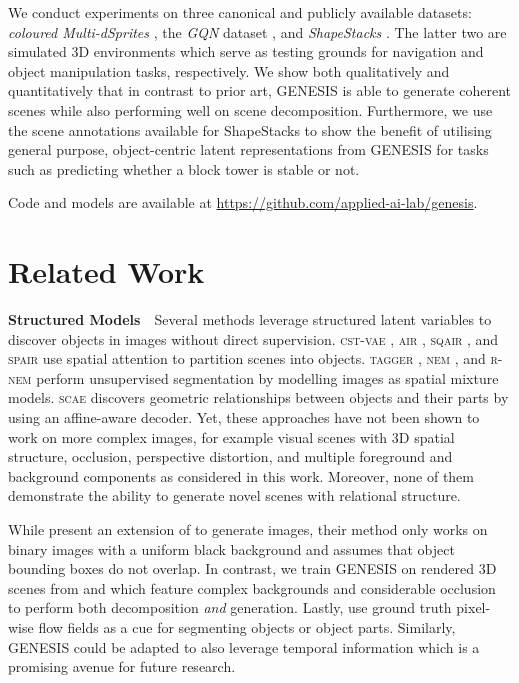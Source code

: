 \documentclass{article}
\begin{document}
We conduct experiments on three canonical and publicly available datasets: \emph{coloured Multi-dSprites} \citep{burgess2019monet}, the \emph{GQN} dataset \citep{eslami2018neural}, and \emph{ShapeStacks} \citep{groth2018shapestacks}.
The latter two are simulated 3D environments which serve as testing grounds for navigation and object manipulation tasks, respectively.
We show both qualitatively and quantitatively that in contrast to prior art, \gls{GENESIS} is able to generate coherent scenes while also performing well on scene decomposition.
Furthermore, we use the scene annotations available for ShapeStacks to show the benefit of utilising general purpose, object-centric latent representations from \gls{GENESIS} for tasks such as predicting whether a block tower is stable or not.

Code and models are available at \url{https://github.com/applied-ai-lab/genesis}.
 \section{Related Work}
\label{sec:related}


\textbf{Structured Models}\ \ 
Several methods leverage structured latent variables to discover objects in images without direct supervision.
\textsc{cst-vae} \citep{huang2015efficient}, \textsc{air} \citep{eslami2016attend}, \textsc{sqair} \citep{kosiorek2018sqair}, and \textsc{spair} \citep{crawford2019spatially} use spatial attention to partition scenes into objects.
\textsc{tagger} \citep{greff2016tagger}, \textsc{nem} \citep{greff2017neural}, and \textsc{r-nem} \citep{van2018relational} perform unsupervised segmentation by modelling images as spatial mixture models.
\textsc{scae} \citep{kosiorek2019stacked} discovers geometric relationships between objects and their parts by using an affine-aware decoder.
Yet, these approaches have not been shown to work on more complex images, for example visual scenes with 3D spatial structure, occlusion, perspective distortion, and multiple foreground and background components as considered in this work.
Moreover, none of them demonstrate the ability to generate novel scenes with relational structure.

While \citet{xu2018multi} present an extension of \citet{eslami2016attend} to generate images, their method only works on binary images with a uniform black background and assumes that object bounding boxes do not overlap.
In contrast, we train \gls{GENESIS} on rendered 3D scenes from \citet{eslami2018neural} and \citet{groth2018shapestacks} which feature complex backgrounds and considerable occlusion to perform both decomposition \emph{and} generation.
Lastly, \cite{xu2019unsupervised} use ground truth pixel-wise flow fields as a cue for segmenting objects or object parts.
Similarly, \gls{GENESIS} could be adapted to also leverage temporal information which is a promising avenue for future research.
\end{document}
